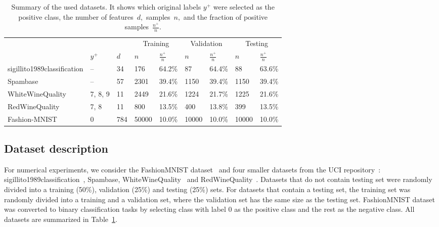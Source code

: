 \begin{table}[ht]
  \centering
  \begin{tabular}{@{}lllllllll@{}}
      \toprule
      &&& \multicolumn{2}{c}{Training}
        & \multicolumn{2}{c}{Validation}
        & \multicolumn{2}{c}{Testing} \\
      \cmidrule(lr){4-5} \cmidrule(lr){6-7} \cmidrule(l){8-9}
        & $y^+$
        & $d$
        & $n$
        & $\frac{n^+}{n}$
        & $n$
        & $\frac{n^+}{n}$
        & $n$
        & $\frac{n^+}{n}$ \\
      \midrule
      sigillito1989classification
        & -- & 34 & 176 & 64.2\% & 87 & 64.4\% & 88 & 63.6\% \\
      Spambase
        & -- & 57 & 2301 & 39.4\% & 1150 & 39.4\% & 1150 & 39.4\% \\
      WhiteWineQuality
        & 7, 8, 9 & 11 & 2449 & 21.6\% & 1224 & 21.7\% & 1225 & 21.6\% \\
      RedWineQuality
        & 7, 8 & 11 & 800 & 13.5\% & 400 & 13.8\% & 399 & 13.5\% \\
      Fashion-MNIST
        & 0 & 784 & 50000 & 10.0\% & 10000 & 10.0\% & 10000 & 10.0\% \\
      \bottomrule
  \end{tabular}
  \caption{Summary of the used datasets. It shows which original labels $y^+$ were selected as the positive class, the number of features~$d,$ samples~$n,$ and the fraction of positive samples~$\frac{n^+}{n}$.}
  \label{tab:Datasets}
\end{table}

\subsection{Dataset description}

For numerical experiments, we consider the FashionMNIST dataset~\cite{xiao2017fashionmnist} and four smaller datasets from the UCI repository~\cite{dua2019uci}: sigillito1989classification~\cite{sigillito1989classification}, Spambase, WhiteWineQuality~\cite{cortez2009modeling} and RedWineQuality~\cite{cortez2009modeling}. Datasets that do not contain testing set were randomly divided into a training (50\%), validation (25\%) and testing (25\%) sets. For datasets that contain a testing set, the training set was randomly divided into a training and a validation set, where the validation set has the same size as the testing set. FashionMNIST dataset was converted to binary classification tasks by selecting class with label 0 as the positive class and the rest as the negative class. All datasets are summarized in Table~\ref{tab:Datasets}.

